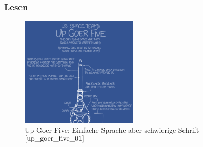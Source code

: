 \subsubsection{Lesen}\label{sec:designClueReading}
\begin{figure}[h]
	\centering
		\includegraphics[width=0.50\textwidth]{Daten/up_goer_five_part.png}
	\caption{Up Goer Five: Einfache Sprache aber schwierige Schrift $^{\ref{up_goer_five_01}}$}
	\label{fig:GoerFive}
\end{figure}

